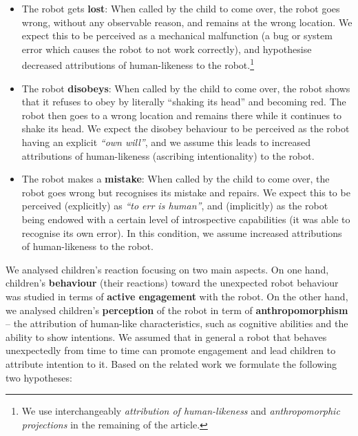\documentclass[letterpaper, 10pt, conference]{ieeeconf}
\begin{document}
\begin{itemize}

    \item The robot gets \textbf{lost}: When called by the child to come over,
        the robot goes wrong, without any observable reason, and remains at the
        wrong location. We expect this to be perceived as a mechanical
        malfunction (a bug or system error which causes the robot to not work
        correctly), and hypothesise decreased attributions of human-likeness to
        the robot.\footnote{We use interchangeably \textit{attribution of
            human-likeness} and \textit{anthropomorphic projections} in the
        remaining of the article.} 

    \item The robot \textbf{disobeys}: When called by the child to come over, the
        robot shows that it refuses to obey by literally ``shaking its head'' and
        becoming red. The robot then goes to a wrong location and remains there
        while it continues to shake its head. We expect the disobey behaviour to
        be perceived as the robot having an explicit \textit{``own will''}, and
        we assume this leads to increased attributions of human-likeness
        (ascribing intentionality) to the robot.

    \item The robot makes a \textbf{mistake}: When called by the child to come
        over, the robot goes wrong but recognises its mistake and repairs. We
        expect this to be perceived (explicitly) as \textit{``to err is
        human''}, and (implicitly) as the robot being endowed with a certain
        level of introspective capabilities (it was able to recognise its own
        error). In this condition, we assume increased attributions of
        human-likeness to the robot.

\end{itemize}

We analysed children's reaction focusing on two main aspects. On one hand,
children's \textbf{behaviour} (their reactions) toward the unexpected robot
behaviour was studied in terms of \textbf{active engagement} with the robot. On
the other hand, we analysed children's \textbf{perception} of the robot in term
of \textbf{anthropomorphism} -- the attribution of human-like characteristics,
such as cognitive abilities and the ability to show intentions. We assumed that
in general a robot that behaves unexpectedly from time to time can promote
engagement and lead children to attribute intention to it. Based
on the related work we formulate the following two hypotheses:
\end{document}
